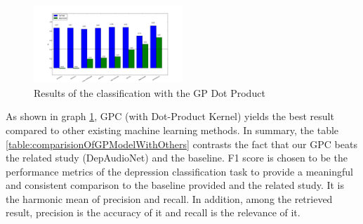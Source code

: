 \documentclass{article}
\begin{document}
         \begin{figure}[h]
 		    \begin{center}
		    \includegraphics[width=0.5\textwidth]{gp_dot_product}
  		    \end{center}
  		    \caption{Results of the classification with the GP Dot Product}
  		    \label{figure:gp_dot_product}
 	 \end{figure}

        \begin{table}[h!]
        \caption{Our GPC beats the related study (DepAudioNet) and the baseline.}
        \label{table:comparisionOfGPModelWithOthers}
        \end{table}

        As shown in graph \ref{figure:gp_dot_product}, GPC (with Dot-Product Kernel) yields the best result compared to other existing machine learning methods. 
        In summary, the table \ref{table:comparisionOfGPModelWithOthers} contrasts the fact that our GPC beats the related study (DepAudioNet) and the baseline.
        F1 score is chosen to be the performance metrics of the depression classification task to provide a meaningful and consistent comparison to the baseline 
        provided and the related study. It is the harmonic mean of precision and recall. 
        In addition, among the retrieved result, precision is the accuracy of it and recall is the relevance of it.
\end{document}
